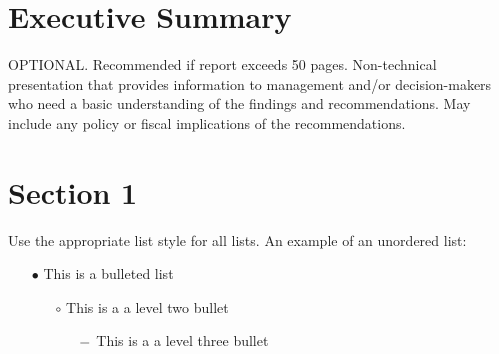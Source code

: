\pagestyle{fancy}
\renewcommand{\headrulewidth}{0pt}
\ExplSyntaxOn
  \fancyhead{}
  \fancyhead[l]{\small \pubnumber \\ 
	\small \pubmonth~\pubyear \\}
   \fancyhead[r]{\small {[ShortTitle1]} \\ 
	\small {[ShortTitle2]} \\}
   \tagmcend
\ExplSyntaxOff
{}

 \tagpdfparaOff {}
\section*{Executive Summary}
\tagmcend
 \tagstructend
\label{sec:es}
\tagpdfparaOn
\normalsize OPTIONAL. Recommended if report exceeds 50 pages. Non-technical presentation that provides information to management and/or decision-makers who need a basic understanding of the findings and recommendations. May include any policy or fiscal implications of the recommendations.
\newpage
 \tagpdfparaOff {}
\section{Section 1}
\tagmcend
 \tagstructend
 
\label{sec:intro}
\tagpdfparaOn
\normalsize 
Use the appropriate list style for all lists. An example of an unordered list:
\begin{itemize}
    \item[$\bullet$]  This is a bulleted list
    \begin{itemize}
        \item[$\circ$] This is a a level two bullet
        \begin{itemize}
        \item[$\--$]  This is a a level three bullet
    \end{itemize}
    \end{itemize}
\end{itemize}

